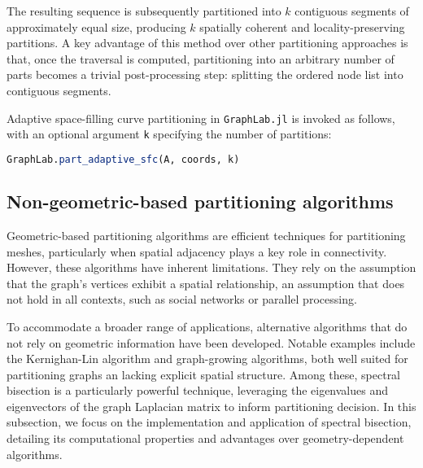 \documentclass[../paper.tex]{subfiles}
\begin{document}
    The resulting sequence is subsequently partitioned into $k$ contiguous segments of approximately equal size, producing $k$ spatially coherent and locality-preserving partitions. A key advantage of this method over other partitioning approaches is that, once the traversal is computed, partitioning into an arbitrary number of parts becomes a trivial post-processing step: splitting the ordered node list into contiguous segments.

    Adaptive space-filling curve partitioning in \texttt{GraphLab.jl} is invoked as follows, with an optional argument \texttt{k} specifying the number of partitions:
    
    \begin{lstlisting}[language=Julia]
    GraphLab.part_adaptive_sfc(A, coords, k)
    \end{lstlisting}

    
    
    
    

    \subsection{Non-geometric-based partitioning algorithms}
    \label{subsec:non-geo}
    Geometric-based partitioning algorithms are efficient techniques for partitioning meshes, particularly
    when spatial adjacency plays a key role in connectivity. However, these algorithms have inherent limitations.
    They rely on the assumption that the graph's vertices exhibit a spatial relationship, an assumption that does not
    hold in all contexts, such as social networks\cite{Newman_2013} or parallel processing\cite{10.1145/2503210.2503293}.
    
    To accommodate a broader range of applications, alternative algorithms that do not rely on geometric information
    have been developed. Notable examples include the Kernighan-Lin algorithm\cite{6771089} and graph-growing algorithms\cite{doi:10.1137/S1064827595287997},
    both well suited for partitioning graphs an lacking explicit spatial structure.
    Among these, spectral bisection is a particularly powerful technique, leveraging
    the eigenvalues and eigenvectors of the graph Laplacian matrix to inform partitioning decision\cite{fiedler75}.
    In this subsection, we focus
    on the implementation and application of spectral bisection, detailing its computational properties and advantages over geometry-dependent algorithms.
\end{document}
